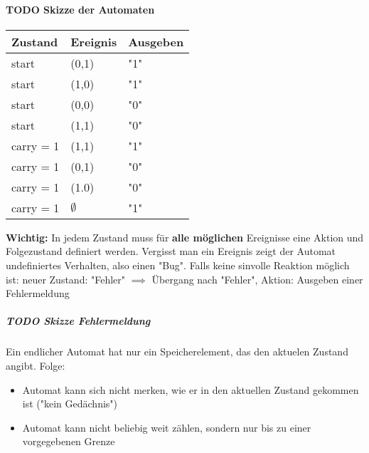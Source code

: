 \documentclass[a4paper]{scrartcl}
\begin{document}
\paragraph{{\bfseries\sffamily TODO} Skizze der Automaten}
\label{sec-3-3-3-2}
\begin{center}
\begin{tabular}{lll}
Zustand & Ereignis & Ausgeben\\
\hline
start & (0,1) & "1"\\
start & (1,0) & "1"\\
start & (0,0) & "0"\\
start & (1,1) & "0"\\
carry = 1 & (1,1) & "1"\\
carry = 1 & (0,1) & "0"\\
carry = 1 & (1.0) & "0"\\
carry = 1 & $\emptyset$ & "1"\\
\end{tabular}
\end{center}
\textbf{Wichtig:} In jedem Zustand muss für \textbf{alle möglichen} Ereignisse eine Aktion und Folgezustand definiert werden.
Vergisst man ein Ereignis zeigt der Automat undefiniertes Verhalten, also einen "Bug".
Falls keine sinvolle Reaktion möglich ist: neuer Zustand: "Fehler" $\implies$ Übergang nach "Fehler",
Aktion: Ausgeben einer Fehlermeldung
\subparagraph{{\bfseries\sffamily TODO} Skizze Fehlermeldung}
\label{sec-3-3-3-2-1}
Ein endlicher Automat hat nur ein Speicherelement, das den aktuelen Zustand angibt. Folge:
\begin{itemize}
\item Automat kann sich nicht merken, wie er in den aktuellen Zustand gekommen ist ("kein Gedächnis")
\item Automat kann nicht beliebig weit zählen, sondern nur bis zu einer vorgegebenen Grenze
\end{itemize}
\begin{center}
\end{center}
\end{document}

